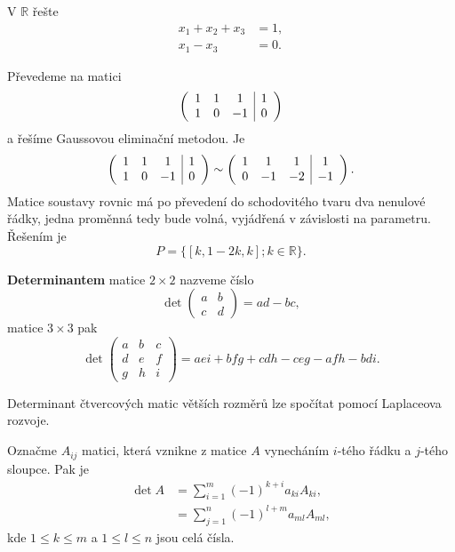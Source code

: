 \begin{priklad}
V $\mathbb R$ řešte
\begin{align*}
    x_1+x_2+x_3&=1,\\
    x_1-x_3 &=0.
\end{align*}
\end{priklad}

\begin{reseni}
Převedeme na matici
$$
\left (
\begin{array}{c c c | c }
1 & 1 & 1 & 1\\
1  & 0 &-1  &0
\end{array}
\right )
$$
a řešíme Gaussovou eliminační metodou. Je
$$\left (
\begin{array}{c c c | c }
1 & 1 & 1 & 1\\
1  & 0 &-1  &0
\end{array}
\right )\sim
\left (
\begin{array}{c c c | c }
1 & 1 & 1 & 1\\
0  & -1 &-2  &-1
\end{array}
\right ).
$$
Matice soustavy rovnic má po převedení do schodovitého tvaru dva nenulové řádky,
jedna proměnná tedy bude volná, vyjádřená v závislosti na parametru. Řešením je
$$P=\{[k,1-2k,k]; k \in \mathbb R\}.$$
\end{reseni}

\begin{definition}
\textbf{Determinantem} matice $2\times 2$ nazveme číslo
$$
    \det \begin{pmatrix}
	a & b \\
	c & d
    \end{pmatrix} = ad-bc,
$$
matice $3\times 3$ pak
$$
    \det \begin{pmatrix}
        a & b & c \\
        d & e & f \\
        g & h & i
    \end{pmatrix} = aei + bfg + cdh - ceg - afh - bdi.
$$
\end{definition}

Determinant čtvercových matic větších rozměrů lze spočítat pomocí Laplaceova rozvoje.

\begin{veta}
Označme $A_{ij}$ matici, která vznikne z matice $A$ vynecháním $i$-tého řádku a $j$-tého sloupce.
Pak je
\begin{align*}
\det A &= \sum_{i=1}^m (-1)^{k+i} a_{ki} A_{ki},\\
	&= \sum_{j=1} ^ n (-1)^{l+m} a_{ml} A_{ml},
\end{align*}
kde $1 \leq k \leq m$ a $1 \leq l \leq n$ jsou celá čísla.
\end{veta}

